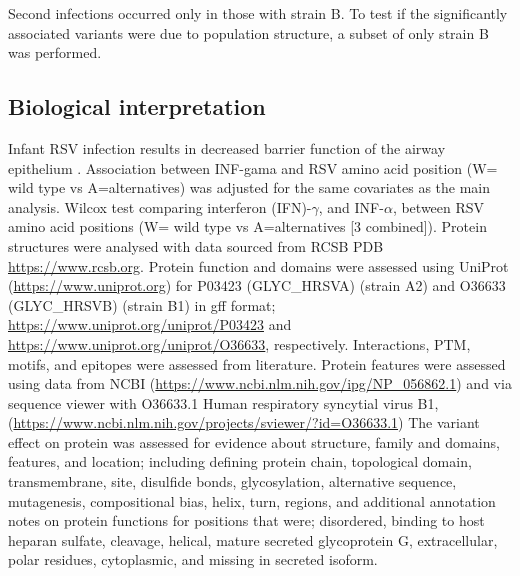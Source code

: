 \documentclass{article} %
\begin{document}
Second infections occurred only in those with strain B. 
To test if the significantly associated variants were due to population structure, 
a subset of only strain B was performed. 

\subsection{Biological interpretation}
Infant RSV infection results in decreased barrier function of the airway epithelium
\cite{connelly2021metabolic}.
Association between INF-gama and RSV amino acid position (W= wild type vs A=alternatives) was adjusted for the same covariates as the main analysis. Wilcox test comparing interferon (IFN)-$\gamma$, and INF-$\alpha$, between RSV amino acid positions (W= wild type vs A=alternatives [3 combined]).
Protein structures were analysed with data sourced from 
RCSB PDB \url{https://www.rcsb.org}.
Protein function and domains were assessed using 
UniProt	(\url{https://www.uniprot.org})
for P03423 (GLYC\_HRSVA) (strain A2) and O36633 (GLYC\_HRSVB) (strain B1) in gff format;
\url{https://www.uniprot.org/uniprot/P03423} and
\url{https://www.uniprot.org/uniprot/O36633}, respectively.
Interactions, PTM, motifs, and epitopes were assessed from literature. 
Protein features were assessed using data from NCBI
(\url{https://www.ncbi.nlm.nih.gov/ipg/NP_056862.1}) and
via sequence viewer with O36633.1 Human respiratory syncytial virus B1, 
(\url{https://www.ncbi.nlm.nih.gov/projects/sviewer/?id=O36633.1})
The variant effect on protein was assessed for evidence about structure, family and domains, features, and location; 
including defining protein chain, topological domain, transmembrane, site, disulfide bonds, glycosylation, alternative sequence, mutagenesis, compositional bias, helix, turn, regions, and additional annotation notes on protein functions for positions that were; disordered, binding to host heparan sulfate, cleavage, helical, mature secreted glycoprotein G, extracellular, polar residues, cytoplasmic, and missing in secreted isoform.
\end{document}
